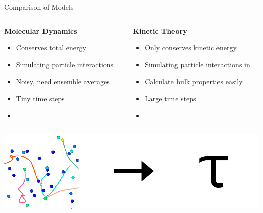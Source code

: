 \documentclass{beamer}
\begin{document}
	\begin{frame}{Comparison of Models}
		\begin{columns}
			\begin{column}{0.55\textwidth}
				\begin{center}\textbf{Molecular Dynamics}\end{center}\vspace{-0.8em}
				\begin{itemize}
					\item  \color{blue}Conserves total energy
					\vspace{0.5em}
					\item  Simulating particle interactions 
					\vspace{0.5em}
					\item  \color{red}Noisy, need ensemble averages
					\vspace{0.5em}
					\item  Tiny time steps
					\vspace{0.5em}
					\item  {}
				\end{itemize}
			\end{column}
			\begin{column}{0.55\textwidth}
				\begin{center}\textbf{Kinetic Theory}\end{center}\vspace{-0.8em}
				\begin{itemize}
					\item  \color{red}Only conserves kinetic energy
					\vspace{0.5em}
					\item  Simulating particle interactions in 
					\vspace{0.5em}
					\item  \color{blue} Calculate bulk properties easily
					\vspace{0.5em}
					\item  Large time steps
					\vspace{0.5em}
					\item  {}
				\end{itemize}
			\end{column}
		\end{columns}
		\begin{center}
			\includegraphics[height=0.3\textheight]{random_walk.png}
		\end{center}
	\end{frame}
	
\end{document}
